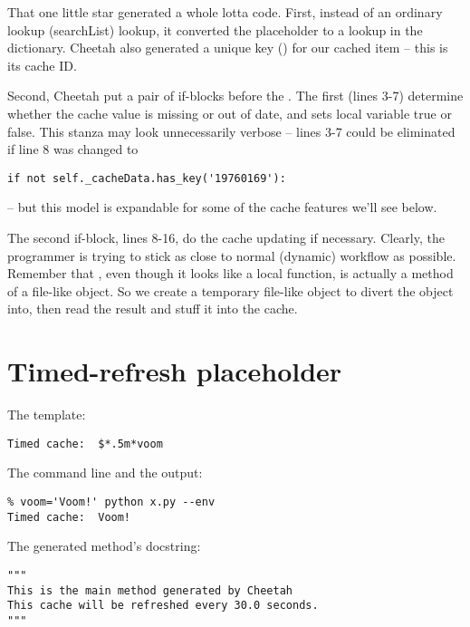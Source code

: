 That one little star generated a whole lotta code.  First, instead of an 
ordinary  lookup (searchList) lookup, it converted the
placeholder to a lookup in the  dictionary.  Cheetah also
generated a unique key () for our cached item -- this is its
cache ID.

Second, Cheetah put a pair of if-blocks before the .  The first
(lines 3-7) determine whether the cache value is missing or out of date, and
sets local variable  true or false.
This stanza may look unnecessarily verbose -- lines 3-7 could be eliminated if
line 8 was changed to
\begin{verbatim}
if not self._cacheData.has_key('19760169'):
\end{verbatim}
-- but this model is expandable for some of the cache features we'll see below.

The second if-block, lines 8-16, do the cache updating if necessary.
Clearly, the programmer is trying to stick as close to normal (dynamic)
workflow as possible.  Remember that , even though it looks like a
local function, is actually a method of a file-like object.  So we create a
temporary file-like object to divert the  object into, then read
the result and stuff it into the cache.

\section{Timed-refresh placeholder}
\label{output.cache.timed}

The template:
\begin{verbatim}
Timed cache:  $*.5m*voom
\end{verbatim}

The command line and the output:
\begin{verbatim}
% voom='Voom!' python x.py --env
Timed cache:  Voom!
\end{verbatim}

The generated method's docstring:
\begin{verbatim}
"""
This is the main method generated by Cheetah
This cache will be refreshed every 30.0 seconds.
"""
\end{verbatim}

